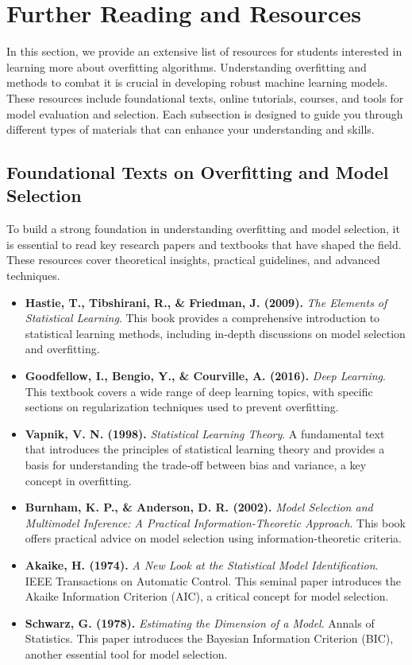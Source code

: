 \documentclass[12pt]{book} %
\begin{document}
\section{Further Reading and Resources}
In this section, we provide an extensive list of resources for students interested in learning more about overfitting algorithms. Understanding overfitting and methods to combat it is crucial in developing robust machine learning models. These resources include foundational texts, online tutorials, courses, and tools for model evaluation and selection. Each subsection is designed to guide you through different types of materials that can enhance your understanding and skills.

\subsection{Foundational Texts on Overfitting and Model Selection}
To build a strong foundation in understanding overfitting and model selection, it is essential to read key research papers and textbooks that have shaped the field. These resources cover theoretical insights, practical guidelines, and advanced techniques.

\begin{itemize}
    \item \textbf{Hastie, T., Tibshirani, R., \& Friedman, J. (2009).} \textit{The Elements of Statistical Learning}. This book provides a comprehensive introduction to statistical learning methods, including in-depth discussions on model selection and overfitting.
    
    \item \textbf{Goodfellow, I., Bengio, Y., \& Courville, A. (2016).} \textit{Deep Learning}. This textbook covers a wide range of deep learning topics, with specific sections on regularization techniques used to prevent overfitting.
    
    \item \textbf{Vapnik, V. N. (1998).} \textit{Statistical Learning Theory}. A fundamental text that introduces the principles of statistical learning theory and provides a basis for understanding the trade-off between bias and variance, a key concept in overfitting.
    
    \item \textbf{Burnham, K. P., \& Anderson, D. R. (2002).} \textit{Model Selection and Multimodel Inference: A Practical Information-Theoretic Approach}. This book offers practical advice on model selection using information-theoretic criteria.
    
    \item \textbf{Akaike, H. (1974).} \textit{A New Look at the Statistical Model Identification}. IEEE Transactions on Automatic Control. This seminal paper introduces the Akaike Information Criterion (AIC), a critical concept for model selection.
    
    \item \textbf{Schwarz, G. (1978).} \textit{Estimating the Dimension of a Model}. Annals of Statistics. This paper introduces the Bayesian Information Criterion (BIC), another essential tool for model selection.
\end{itemize}
\end{document}
